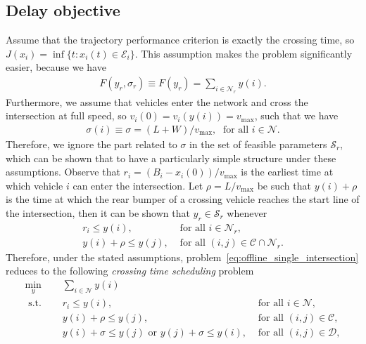 \documentclass[a4paper]{article}
\theoremstyle{definition}
\theoremstyle{plain}
\begin{document}
\subsection*{Delay objective}

Assume that the trajectory performance criterion is exactly the crossing time,
so $J(x_{i}) = \inf \{ t: x_{i}(t) \in \mathcal{E}_{i} \}$. This assumption
makes the problem significantly easier, because we have
\begin{align}
  F(y_{r}, \sigma_{r}) \equiv F(y_{r}) = \sum_{i \in \mathcal{N}_{r}} y(i) .
\end{align}
%
Furthermore, we assume that vehicles enter the network and cross the
intersection at full speed, so $v_{i}(0) = v_{i}(y(i)) = v_{\max}$, such that we
have
\begin{align}
\sigma(i) \equiv \sigma = (L + W) / v_{\max}, \; \text{ for all } i \in \mathcal{N} .
\end{align}
%
Therefore, we ignore the part related to $\sigma$ in the set of feasible
parameters $\mathcal{S}_{r}$, which can be shown that to have a particularly
simple structure under these assumptions.
Observe that $r_{i} = (B_{i} - x_{i}(0)) / v_{\max}$ is the earliest time at
which vehicle $i$ can enter the intersection.
%
Let $\rho = L / v_{\max}$ be such that $y(i) + \rho$ is the time at which
the rear bumper of a crossing vehicle reaches the start line of the
intersection, then it can be shown that
$y_{r} \in \mathcal{S}_{r}$ whenever
\begin{subequations}
\begin{align}
  r_{i} \leq y(i) , & \text{ for all } i \in \mathcal{N}_{r} , \\
  y(i) + \rho \leq y(j) , & \text{ for all } (i,j) \in \mathcal{C} \cap \mathcal{N}_{r} .
\end{align}
\end{subequations}
Therefore, under the stated assumptions,
problem~\eqref{eq:offline_single_intersection} reduces to the following \textit{crossing time scheduling} problem
\begin{subequations}
\begin{align}
  \min_{y} \quad & \sum_{i \in \mathcal{N}} y(i) \\
  \text{ s.t. } \quad & r_{i} \leq y(i) , & \text{ for all } i \in \mathcal{N} , \\
                    & y(i) + \rho \leq y(j) , & \text{ for all } (i,j) \in \mathcal{C} , \\
                    & y(i) + \sigma \leq y(j) \text{ or } y(j) + \sigma \leq y(i) , & \text{ for all } (i,j) \in \mathcal{D} \label{eq:disjunctive} ,
\end{align}
\end{subequations}
\end{document}
